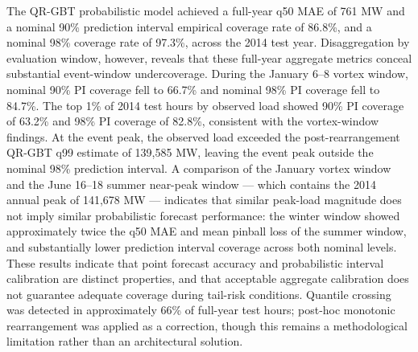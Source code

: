 \documentclass[12pt,a4paper]{article}
\begin{document}
The QR-GBT probabilistic model achieved a full-year q50 MAE of 761 MW and a nominal 90\% prediction interval empirical coverage rate of 86.8\%, and a nominal 98\% coverage rate of 97.3\%, across the 2014 test year. Disaggregation by evaluation window, however, reveals that these full-year aggregate metrics conceal substantial event-window undercoverage. During the January 6–8 vortex window, nominal 90\% PI coverage fell to 66.7\% and nominal 98\% PI coverage fell to 84.7\%. The top 1\% of 2014 test hours by observed load showed 90\% PI coverage of 63.2\% and 98\% PI coverage of 82.8\%, consistent with the vortex-window findings. At the event peak, the observed load exceeded the post-rearrangement QR-GBT q99 estimate of 139,585 MW, leaving the event peak outside the nominal 98\% prediction interval. A comparison of the January vortex window and the June 16–18 summer near-peak window --- which contains the 2014 annual peak of 141,678 MW --- indicates that similar peak-load magnitude does not imply similar probabilistic forecast performance: the winter window showed approximately twice the q50 MAE and mean pinball loss of the summer window, and substantially lower prediction interval coverage across both nominal levels. These results indicate that point forecast accuracy and probabilistic interval calibration are distinct properties, and that acceptable aggregate calibration does not guarantee adequate coverage during tail-risk conditions. Quantile crossing was detected in approximately 66\% of full-year test hours; post-hoc monotonic rearrangement was applied as a correction, though this remains a methodological limitation rather than an architectural solution.
\end{document}
